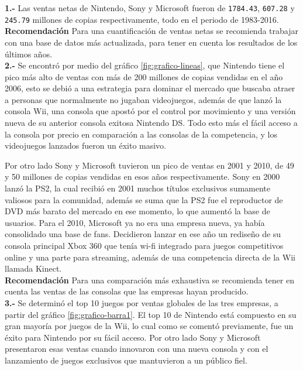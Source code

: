 \documentclass[oneside,11pt]{Latex/Classes/PhDthesisPSnPDF}
\begin{document}
\textbf{1.-} Las ventas netas de Nintendo, Sony y Microsoft fueron de
\texttt{1784.43}, \texttt{607.28} y \texttt{245.79} millones de copias
respectivamente, todo en el periodo de 1983-2016.\\

\textbf{Recomendación} Para una cuantificación de ventas netas se
recomienda trabajar con una base de datos más actualizada, para tener en
cuenta los resultados de los últimos años.\\

\textbf{2.-} Se encontró por medio del gráfico \ref{fig:grafico-lineas},
que Nintendo tiene el pico más alto de ventas con más de 200 millones de
copias vendidas en el año 2006, esto se debió a una estrategia para
dominar el mercado que buscaba atraer a personas que normalmente no
jugaban videojuegos, además de que lanzó la consola Wii, una consola que
apostó por el control por movimiento y una versión nueva de su anterior
consola exitosa Nintendo DS. Todo esto más el fácil acceso a la consola
por precio en comparación a las consolas de la competencia, y los
videojuegos lanzados fueron un éxito masivo.

Por otro lado Sony y Microsoft tuvieron un pico de ventas en 2001 y
2010, de 49 y 50 millones de copias vendidas en esos años
respectivamente. Sony en 2000 lanzó la PS2, la cual recibió en 2001
muchos títulos exclusivos sumamente valiosos para la comunidad, además
se suma que la PS2 fue el reproductor de DVD más barato del mercado en
ese momento, lo que aumentó la base de usuarios. Para el 2010, Microsoft
ya no era una empresa nueva, ya había consolidado una base de fans.
Decidieron lanzar en ese año un rediseño de su consola principal Xbox
360 que tenía wi-fi integrado para juegos competitivos online y una
parte para streaming, además de una competencia directa de la Wii
llamada Kinect.\\

\textbf{Recomendación} Para una comparación más exhaustiva se recomienda
tener en cuenta las ventas de las consolas que las empresas hayan
producido.\\

\textbf{3.-} Se determinó el top 10 juegos por ventas globales de las
tres empresas, a partir del gráfico \ref{fig:grafico-barra1}. El top 10
de Nintendo está compuesto en su gran mayoría por juegos de la Wii, lo
cual como se comentó previamente, fue un éxito para Nintendo por su
fácil acceso. Por otro lado Sony y Microsoft presentaron esas ventas
cuando innovaron con una nueva consola y con el lanzamiento de juegos
exclusivos que mantuvieron a un público fiel.\\
\end{document}
